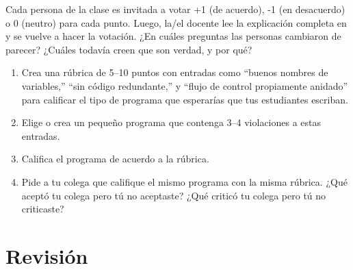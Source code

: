 Cada persona de la clase es invitada a votar +1 (de acuerdo), -1 (en desacuerdo) o 0 (neutro) para cada punto.
Luego, la/el docente lee la explicación completa en
y se vuelve a hacer la votación.
¿En cuáles preguntas las personas cambiaron de parecer?
¿Cuáles todavía creen que son verdad, y por qué?


\begin{enumerate}

\item
  Crea una rúbrica de 5--10 puntos
  con entradas como ``buenos nombres de variables,'' ``sin código redundante,'' y ``flujo de control propiamente anidado''
  para calificar el tipo de programa que esperarías que tus estudiantes escriban.

\item
  Elige o crea un pequeño programa que contenga 3--4 violaciones a estas entradas.

\item
  Califica el programa de acuerdo a la rúbrica.

\item
  Pide a tu colega que califique el mismo programa con la misma rúbrica.
  ¿Qué aceptó tu colega pero tú no aceptaste?
  ¿Qué criticó tu colega pero tú no criticaste?

\end{enumerate}

\section*{Revisión}

